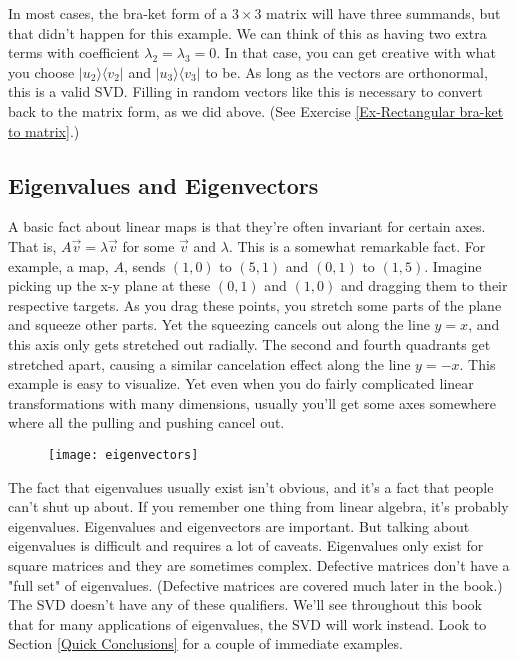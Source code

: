 \documentclass{amsbook}
\begin{document}
In most cases, the bra-ket form of a $3\times3$ matrix will have three summands, but that didn't happen for this example.  We can think of this as having two extra terms with coefficient $\lambda_2=\lambda_3=0$.  In that case, you can get creative with what you choose $|u_2\rangle\langle v_2|$ and $|u_3\rangle\langle v_3|$ to be.  As long as the vectors are orthonormal, this is a valid SVD.  Filling in random vectors like this is necessary to convert back to the matrix form, as we did above.  (See Exercise \ref{Ex-Rectangular bra-ket to matrix}.)

\subsection{Eigenvalues and Eigenvectors}

A basic fact about linear maps is that they're often invariant for certain axes.  That is, $A\vec v=\lambda\vec v$ for some $\vec v$ and $\lambda$.  This is a somewhat remarkable fact.  For example, a map, $A$, sends $(1, 0)$ to $(5, 1)$ and $(0, 1)$ to $(1, 5)$.  Imagine picking up the x-y plane at these $(0, 1)$ and $(1, 0)$ and dragging them to their respective targets.  As you drag these points, you stretch some parts of the plane and squeeze other parts.  Yet the squeezing cancels out along the line $y=x$, and this axis only gets stretched out radially.  The second and fourth quadrants get stretched apart, causing a similar cancelation effect along the line $y=-x$.  This example is easy to visualize.  Yet even when you do fairly complicated linear transformations with many dimensions, usually you'll get some axes somewhere where all the pulling and pushing cancel out.

\begin{figure}
\centering
\texttt{[image: eigenvectors]}
\end{figure}

The fact that eigenvalues usually exist isn't obvious, and it's a fact that people can't shut up about.  If you remember one thing from linear algebra, it's probably eigenvalues.  Eigenvalues and eigenvectors are important.  But talking about eigenvalues is difficult and requires a lot of caveats.  Eigenvalues only exist for square matrices and they are sometimes complex.  Defective matrices don't have a "full set" of eigenvalues.  (Defective matrices are covered much later in the book.)  The SVD doesn't have any of these qualifiers.  We'll see throughout this book that for many applications of eigenvalues, the SVD will work instead.  Look to Section \ref{Quick Conclusions} for a couple of immediate examples.
\end{document}
